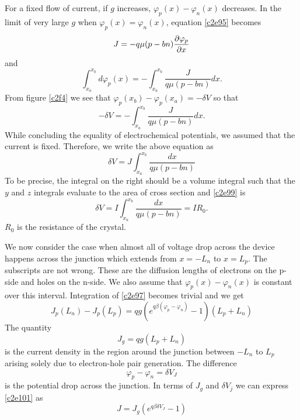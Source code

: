 For a fixed flow of current, if $g$ increases, $\varphi_p(x) - \varphi_n(x)$
decreases. In the limit of very large $g$ when $\varphi_p(x) = \varphi_n(x)$,
equation \eqref{c2e95} becomes
\begin{equation}\label{c2e98}
J = -q\mu(p - bn)\frac{\partial{\varphi_p}}{\partial{x}}
\end{equation}
and
\[
\int_{x_a}^{x_b}d\varphi_p(x) = -\int_{x_a}^{x_b}\frac{J}{q\mu(p - bn)}dx.
\]
From figure \ref{c2f4} we see that $\varphi_p(x_b) - \varphi_p(x_a) = -\delta V$
so that
\[
-\delta V =  -\int_{x_a}^{x_b}\frac{J}{q\mu(p - bn)}dx.
\]
While concluding the equality of electrochemical potentials, we assumed that the
current is fixed. Therefore, we write the above equation as 
\begin{equation}\label{c2e99}
\delta V = J\int_{x_a}^{x_b}\frac{dx}{q\mu(p - bn)}
\end{equation}
To be precise, the integral on the right should be a volume integral such that
the $y$ and $z$ integrals evaluate to the area of cross section and 
\eqref{c2e99} is
\begin{equation}\label{c2e100}
\delta V = I\int_{x_a}^{x_b}\frac{dx}{q\mu(p - bn)} = IR_0.
\end{equation}
$R_0$ is the resistance of the crystal.

We now consider the case when almost all of voltage drop across the device 
happens across the junction which extends from $x = -L_n$ to $x = L_p$. The
subscripts are not wrong. These are the diffusion lengths of electrons on the
p-side and holes on the n-side. We also assume that $\varphi_p(x) - 
\varphi_n(x)$ is constant over this interval. Integration of \eqref{c2e97}
becomes trivial and we get
\begin{equation}\label{c2e101}
J_p(L_n) - J_p(L_p) = qg(e^{q\beta(\varphi_p - \varphi_n)} - 1)(L_p + L_n)
\end{equation}
The quantity
\begin{equation}\label{c2e102}
J_g = qg(L_p + L_n)
\end{equation}
is the current density in the region around the junction between $-L_n$ to
$L_p$ arising solely due to electron-hole pair generation. The difference
\begin{equation}\label{c2e103}
\varphi_p - \varphi_n = \delta V_J
\end{equation}
is the potential drop across the junction. In terms of $J_g$ and $\delta V_j$
we can express \eqref{c2e101} as
\begin{equation}\label{c2e104}
J = J_g(e^{q\beta\delta V_J} - 1)
\end{equation}

